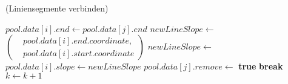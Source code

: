 \begin{algorithm}[!ht]
\caption{ (Liniensegmente verbinden)}
\label{alg:mergelines5}
\begin{algorithmic}[1]
	\label{alg:mergelines5-extendline}
		\State $\mathit{pool.data}[i]\mathit{.end} \gets \mathit{pool.data}[j]\mathit{.end}$
		\label{alg:mergelines5-merge-start}
		\State $\mathit{newLineSlope} \gets$ 
		$\left(
		\begin{aligned}
			& \mathit{pool.data}[i]\mathit{.end.coordinate},\\
			& \mathit{pool.data}[i]\mathit{.start.coordinate}
		\end{aligned}\right)$
		\State $\mathit{newLineSlope} \gets$ 
		\State $\mathit{pool.data}[i]\mathit{.slope} \gets \mathit{newLineSlope}$
		\State $\mathit{pool.data}[j]\mathit{.remove} \gets$ \textbf{true}
		\label{alg:mergelines5-merge-end}
	\Else
		\State \textbf{break}
	\EndIf
	\State $k \gets k + 1$
	\EndFor
	\label{alg:mergelines5-loop-end}
\end{algorithmic}
\end{algorithm}
